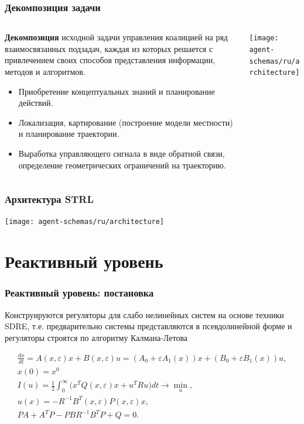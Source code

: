 \documentclass[default]{beamer}
\begin{document}
	\begin{frame}
		\frametitle{Декомпозиция задачи}
		\footnotesize
		
		\begin{columns}
			\begin{column}{0.6\textwidth}
				\textbf{Декомпозиция} исходной задачи управления коалицией на ряд взаимосвязанных подзадач, каждая из которых решается с привлечением своих способов представления информации, методов и алгоритмов.
				\begin{itemize}
					\item Приобретение концептуальных знаний и планирование действий.
					\item Локализация, картирование (построение модели местности) и планирование траектории.
					\item Выработка управляющего сигнала в виде обратной связи, определение геометрических ограничений на траекторию.
				\end{itemize}
				
			\end{column}
			\begin{column}{0.4\textwidth}
				\texttt{[image: agent-schemas/ru/architecture]}
			\end{column}
	
		\end{columns}
		\vspace{-5pt}
		\nocite{*}
		\printbibliography[keyword={strl}, resetnumbers=true]
	\end{frame}
	
	\begin{frame}
		\frametitle{Архитектура STRL}
		\centering
		\texttt{[image: agent-schemas/ru/architecture]}
	\end{frame}
			
	\section{Реактивный уровень}
	\begin{frame}
		\frametitle{Реактивный уровень: постановка}
		
		Конструируются регуляторы для слабо нелинейных систем на основе техники SDRE, т.е. предварительно системы представляются в псевдолинейной форме и регуляторы строятся по алгоритму Калмана-Летова
		
		\[\begin{matrix}
		\frac{dx}{dt}=A(x,\varepsilon )x+B(x,\varepsilon )u=({{A}_{0}}+\varepsilon {{A}_{1}}(x))x+({{B}_{0}}+\varepsilon {{B}_{1}}(x))u,\\ x(0)={{x}^{0}} \\ 
		I(u)=\frac{1}{2}\int_{0}^{\infty }{({{x}^{T}}Q(x,\varepsilon )x}+{{u}^{T}}Ru)dt\to \underset{u}{\mathop{\min }}, \\ 
		u(x)=-{{R}^{-1}}{{B}^{T}}(x,\varepsilon )P(x,\varepsilon )x,\\ PA+{{A}^{T}}P-PB{{R}^{-1}}{{B}^{T}}P+Q=0. \\ 
		\end{matrix}\]
		\par\bigskip
		\nocite{*}
		\printbibliography[keyword={control}, resetnumbers=true]
	\end{frame}
	
\end{document}
